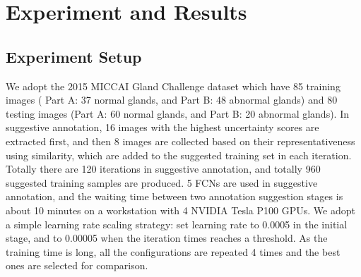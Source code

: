 \documentclass[10pt,twocolumn,letterpaper]{article}
\begin{document}
\vspace{-1pt}
\section{Experiment and Results}
\subsection{Experiment Setup}
We adopt the 2015 MICCAI Gland Challenge dataset \cite{sirinukunwattana2017gland} which have 85 training images ( Part A: 37 normal glands, and Part B: 48 abnormal glands) and 80 testing images (Part A: 60 normal glands, and Part B: 20 abnormal glands).
In suggestive annotation, 16 images with the highest uncertainty scores are extracted first, and then 8 images are collected based on their representativeness using similarity, which are added to the suggested training set in each iteration.
Totally there are 120 iterations in suggestive annotation, and totally 960 suggested training samples are produced.
5 FCNs are used in suggestive annotation, and the waiting time between two annotation suggestion stages is about 10 minutes on a workstation with 4 NVIDIA Tesla P100 GPUs.
We adopt a simple learning rate scaling strategy: set learning rate to 0.0005 in the initial stage, and to 0.00005 when the iteration times reaches a threshold.
As the training time is long, all the configurations are repeated 4 times and the best ones are selected for comparison.
\end{document}
